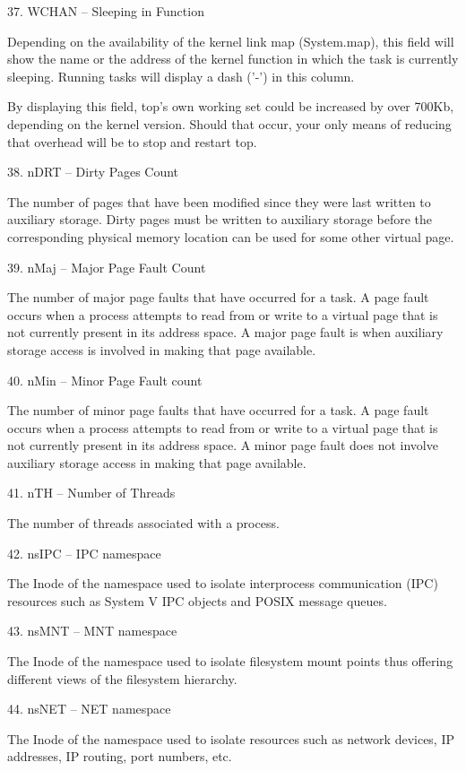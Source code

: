 37. WCHAN  --  Sleeping in Function \par
Depending on the availability of the kernel link map (System.map), this field will show the name or the address of the kernel function in which the task is currently sleeping.  Running tasks will display a dash ('-') in this column.

By displaying this field, top's own working set could be increased by over 700Kb, depending on the kernel version.  Should that occur, your only means of reducing that overhead will be to stop and restart top.

38. nDRT  --  Dirty Pages Count \par
The number of pages that have been modified since they were last written to auxiliary storage.  Dirty pages must be written to auxiliary storage before the corresponding physical memory location can be used for some other virtual page.

39. nMaj  --  Major Page Fault Count    \par
The number of major page faults that have occurred for a task.  A page fault occurs when a process attempts to read from or write to a virtual page that is not currently present in its address space.  A major page fault is when auxiliary  storage  access
is involved in making that page available.

40. nMin  --  Minor Page Fault count    \par
The number of minor page faults that have occurred for a task.  A page fault occurs when a process attempts to read from or write to a virtual page that is not currently present in its address space.  A minor page fault does not involve auxiliary storage
access in making that page available.

41. nTH  --  Number of Threads  \par
The number of threads associated with a process.

42. nsIPC  --  IPC namespace    \par
The Inode of the namespace used to isolate interprocess communication (IPC) resources such as System V IPC objects and POSIX message queues.

43. nsMNT  --  MNT namespace    \par
The Inode of the namespace used to isolate filesystem mount points thus offering different views of the filesystem hierarchy.

44. nsNET  --  NET namespace    \par
The Inode of the namespace used to isolate resources such as network devices, IP addresses, IP routing, port numbers, etc.

